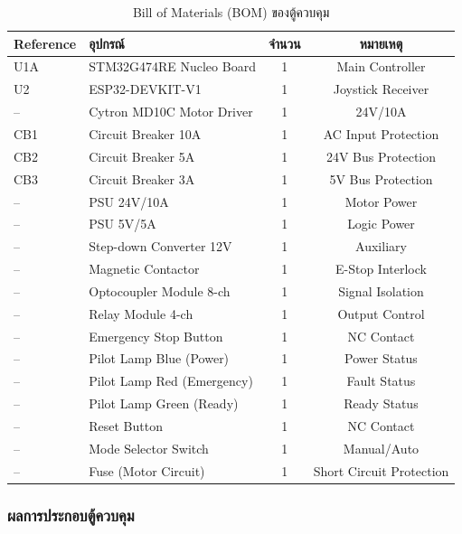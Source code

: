 \begin{table}[H]
  \centering
  \caption{Bill of Materials (BOM) ของตู้ควบคุม}
  \label{tab:bom}
  \begin{tabular}{llcc}
    \toprule
    Reference & อุปกรณ์ & จำนวน & หมายเหตุ \\
    \midrule
    U1A       & STM32G474RE Nucleo Board    & 1 & Main Controller \\
    U2        & ESP32-DEVKIT-V1             & 1 & Joystick Receiver \\
    --        & Cytron MD10C Motor Driver   & 1 & 24V/10A \\
    CB1       & Circuit Breaker 10A         & 1 & AC Input Protection \\
    CB2       & Circuit Breaker 5A          & 1 & 24V Bus Protection \\
    CB3       & Circuit Breaker 3A          & 1 & 5V Bus Protection \\
    --        & PSU 24V/10A                 & 1 & Motor Power \\
    --        & PSU 5V/5A                   & 1 & Logic Power \\
    --        & Step-down Converter 12V     & 1 & Auxiliary \\
    --        & Magnetic Contactor          & 1 & E-Stop Interlock \\
    --        & Optocoupler Module 8-ch     & 1 & Signal Isolation \\
    --        & Relay Module 4-ch           & 1 & Output Control \\
    --        & Emergency Stop Button       & 1 & NC Contact \\
    --        & Pilot Lamp Blue (Power)     & 1 & Power Status \\
    --        & Pilot Lamp Red (Emergency)  & 1 & Fault Status \\
    --        & Pilot Lamp Green (Ready)    & 1 & Ready Status \\
    --        & Reset Button                & 1 & NC Contact \\
    --        & Mode Selector Switch        & 1 & Manual/Auto \\
    --        & Fuse (Motor Circuit)        & 1 & Short Circuit Protection \\
    \bottomrule
  \end{tabular}
\end{table}

\subsubsection{ผลการประกอบตู้ควบคุม}
\label{subsubsec:cabinet_assembly_result}

